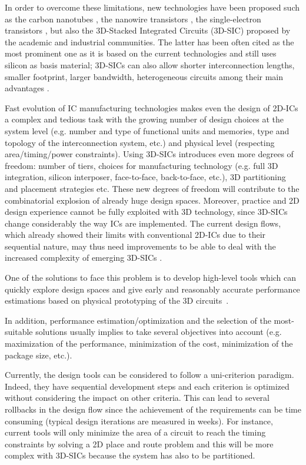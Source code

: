 In order to overcome these limitations, new technologies have been proposed such as the carbon nanotubes \cite{tans1998room}, the nanowire transistors \cite{doi:10.1021/nl025875l}, the single-electron transistors \cite{citeulike:4194929}, but also the 3D-Stacked Integrated Circuits (3D-SIC) proposed by the academic and industrial communities. The latter has been often cited as the most prominent one as it is based on the current technologies and still uses silicon as basis material; 3D-SICs can also allow shorter interconnection lengths, smaller footprint, larger bandwidth, heterogeneous circuits among their main advantages \cite{659500,1652906,981091,4299568}.

Fast evolution of IC manufacturing technologies makes even the design of 2D-ICs a complex and tedious task with the growing number of design choices at the system level (e.g. number and type of functional units and memories, type and topology of the interconnection system, etc.) and physical level (respecting area/timing/power constraints). Using 3D-SICs introduces even more degrees of freedom: number of tiers, choices for manufacturing technology (e.g. full 3D integration, silicon interposer, face-to-face, back-to-face, etc.), 3D partitioning and placement strategies etc. These new degrees of freedom will contribute to the combinatorial explosion of already huge design spaces. Moreover, practice and 2D design experience cannot be fully exploited with 3D technology, since 3D-SICs change considerably the way ICs are implemented. The current design flows, which already showed their limits with conventional 2D-ICs due to their sequential nature, may thus need improvements to be able to deal with the increased complexity of emerging 3D-SICs \cite{vanderbiest06, PFF10}.

One of the solutions to face this problem is to develop high-level tools which can quickly explore design spaces and give early and reasonably accurate performance estimations based on physical prototyping of the 3D circuits~\cite{PFF10}.

In addition, performance estimation/optimization and the selection of the most-suitable solutions usually implies to take several objectives into account (e.g. maximization of the performance, minimization of the cost, minimization of the package size, etc.).

Currently, the design tools can be considered to follow a uni-criterion paradigm. Indeed, they have sequential development steps and each criterion is optimized without considering the impact on other criteria. This can lead to several rollbacks in the design flow since the achievement of the requirements can be time consuming (typical design iterations are measured in weeks). For instance, current tools will only minimize the area of a circuit to reach the timing constraints by solving a 2D place and route problem and this will be more complex with 3D-SICs because the system has also to be partitioned.

